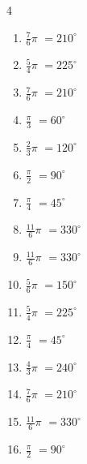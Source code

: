 \begin{multicols}{4}
\begin{enumerate}
  \item $\displaystyle \frac{7}{6}\pi$
        $\displaystyle =210^{\circ}$

  \item $\displaystyle \frac{5}{4}\pi$
        $\displaystyle =225^{\circ}$

  \item $\displaystyle \frac{7}{6}\pi$
        $\displaystyle =210^{\circ}$

\columnbreak %

\resetques

  \item $\displaystyle \frac{\pi}{3}$
        $\displaystyle =60^{\circ}$

  \item $\displaystyle \frac{2}{3}\pi$
        $\displaystyle =120^{\circ}$

  \item $\displaystyle \frac{\pi}{2}$
        $\displaystyle =90^{\circ}$

  \item $\displaystyle \frac{\pi}{4}$
        $\displaystyle =45^{\circ}$

  \item $\displaystyle \frac{11}{6}\pi$
        $\displaystyle =330^{\circ}$

  \item $\displaystyle \frac{11}{6}\pi$
        $\displaystyle =330^{\circ}$

  \item $\displaystyle \frac{5}{6}\pi$
        $\displaystyle =150^{\circ}$

  \item $\displaystyle \frac{5}{4}\pi$
        $\displaystyle =225^{\circ}$

  \item $\displaystyle \frac{\pi}{4}$
        $\displaystyle =45^{\circ}$

  \item $\displaystyle \frac{4}{3}\pi$
        $\displaystyle =240^{\circ}$

  \item $\displaystyle \frac{7}{6}\pi$
        $\displaystyle =210^{\circ}$

  \item $\displaystyle \frac{11}{6}\pi$
        $\displaystyle =330^{\circ}$

  \item $\displaystyle \frac{\pi}{2}$
        $\displaystyle =90^{\circ}$


\end{enumerate}
\end{multicols}
